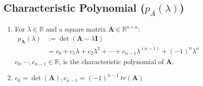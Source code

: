 \subsection{Characteristic Polynomial ($p_A(\lambda)$)}

\begin{enumerate}
    \item 
    \begin{definition}
        For $\lambda \in \mathbb{R}$ and a square matrix $\bm{A} \in \mathbb{R}^{n\times n}$:
        \\
        $
            \begin{aligned}
                p_{\bm{A}}(\lambda ) &:= \det(\bm{A} - \lambda \bm{I}) \\
                &= c_0 + c_1\lambda  + c_2\lambda  ^2 + \cdots + c_{n-1}\lambda ^{( n-1)} + (-1)^n\lambda^  n
            \end{aligned}
        $
        \\
        $c_0, \cdots , c_{n-1} \in \mathbb{R}$, is the characteristic polynomial of $\bm{A}$.
    \end{definition}

    \item $c_0 = \det(\bm{A}), c_{n-1} = (-1)^{n-1}\ tr(\bm{A})$
\end{enumerate}









